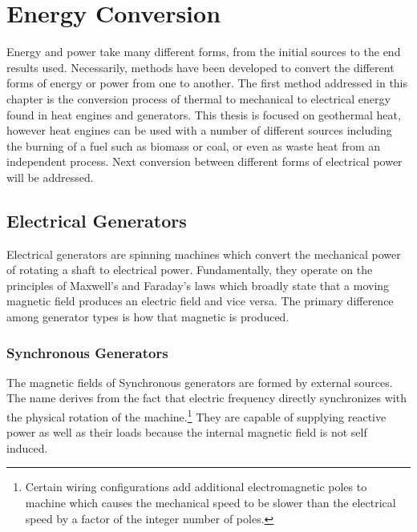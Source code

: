 \chapter{Energy Conversion}
\label{ch:conv}

Energy and power take many different forms, from the initial sources to the end results used. Necessarily, methods have been developed to convert the different forms of energy or power from one to another. The first method addressed in this chapter is the conversion process of thermal to mechanical to electrical energy found in heat engines and generators. This thesis is focused on geothermal heat, however heat engines can be used with a number of different sources including the burning of a fuel such as biomass or coal, or even as waste heat from an independent process. Next conversion between different forms of electrical power will be addressed.



\section{Electrical Generators}
Electrical generators are spinning machines which convert the mechanical power of rotating a shaft to electrical power. Fundamentally, they operate on the principles of Maxwell's and Faraday's laws which broadly state that a moving magnetic field produces an electric field and vice versa. The primary difference among generator types is how that magnetic is produced. 

\subsection{Synchronous Generators}
The magnetic fields of Synchronous generators are formed by external sources. The name derives from the fact that electric frequency directly synchronizes with the physical rotation of the machine.\footnote{Certain wiring configurations add additional electromagnetic poles to machine which causes the mechanical speed to be slower than the electrical speed by a factor of the integer number of poles.} They are capable of supplying reactive power as well as their loads because the internal magnetic field is not self induced. 

